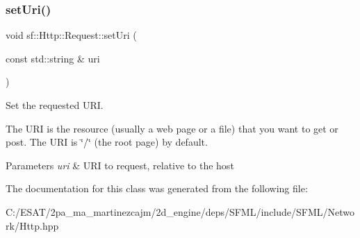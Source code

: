 \subsubsection{\texorpdfstring{set\+Uri()}{setUri()}}
{\footnotesize\ttfamily void sf\+::\+Http\+::\+Request\+::set\+Uri (\begin{DoxyParamCaption}\item[{const std\+::string \&}]{uri }\end{DoxyParamCaption})}



Set the requested U\+RI. 

The U\+RI is the resource (usually a web page or a file) that you want to get or post. The U\+RI is \char`\"{}/\char`\"{} (the root page) by default.


\begin{DoxyParams}{Parameters}
{\em uri} & U\+RI to request, relative to the host \\
\hline
\end{DoxyParams}


The documentation for this class was generated from the following file\+:\begin{DoxyCompactItemize}
\item 
C\+:/\+E\+S\+A\+T/2pa\+\_\+ma\+\_\+martinezcajm/2d\+\_\+engine/deps/\+S\+F\+M\+L/include/\+S\+F\+M\+L/\+Network/Http.\+hpp\end{DoxyCompactItemize}
